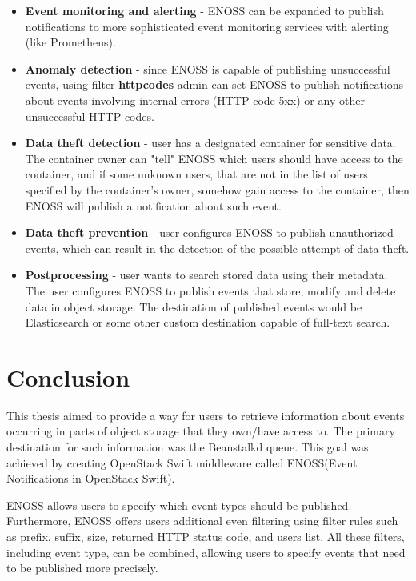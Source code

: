     \begin{itemize}
        \item \textbf{Event monitoring and alerting} - ENOSS can be expanded to publish notifications to more sophisticated event monitoring services with alerting (like Prometheus).

        \item \textbf{Anomaly detection} - since ENOSS is capable of publishing unsuccessful events, using filter \textbf{httpcodes} admin can set ENOSS to publish notifications about events involving internal errors (HTTP code 5xx) or any other unsuccessful HTTP codes.

        \item \textbf{Data theft detection} - user has a designated container for sensitive data. The container owner can "tell" ENOSS which users should have access to the container, and if some unknown users, that are not in the list of users specified by the container's owner, somehow gain access to the container, then ENOSS will publish a notification about such event.

        \item \textbf{Data theft prevention} - user configures ENOSS to publish unauthorized events, which can result in the detection of the possible attempt of data theft.

        \item \textbf{Postprocessing} - user wants to search stored data using their metadata. The user configures ENOSS to publish events that store, modify and delete data in object storage. The destination of published events would be Elasticsearch or some other custom destination capable of full-text search.
    \end{itemize}

\chapter{Conclusion}\label{chap:conclusion}
    This thesis aimed to provide a way for users to retrieve information about events occurring in parts of object storage that they own/have access to. The primary destination for such information was the Beanstalkd queue. This goal was achieved by creating OpenStack Swift middleware called ENOSS(Event Notifications in OpenStack Swift).

    ENOSS allows users to specify which event types should be published. Furthermore, ENOSS offers users additional even filtering using filter rules such as prefix, suffix, size, returned HTTP status code, and users list. All these filters, including event type, can be combined, allowing users to specify events that need to be published more precisely.

